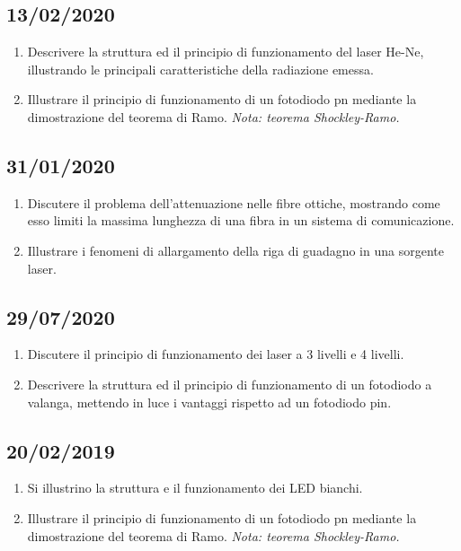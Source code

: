 \documentclass{article}
\begin{document}
\subsection{13/02/2020}
\begin{enumerate}
  \item Descrivere la struttura ed il principio di funzionamento del laser He-Ne, illustrando le principali caratteristiche della radiazione emessa.
  \item Illustrare il principio di funzionamento di un fotodiodo pn mediante la dimostrazione del teorema di Ramo. \textit{Nota: teorema Shockley-Ramo.}
\end{enumerate}

\subsection{31/01/2020}
\begin{enumerate}
  \item Discutere il problema dell’attenuazione nelle fibre ottiche, mostrando come esso limiti la massima lunghezza di
        una fibra in un sistema di comunicazione.
  \item Illustrare i fenomeni di allargamento della riga di guadagno in una sorgente laser.
\end{enumerate}

\subsection{29/07/2020}
\begin{enumerate}
  \item Discutere il principio di funzionamento dei laser a 3 livelli e 4 livelli.
  \item Descrivere la struttura ed il principio di funzionamento di un fotodiodo a valanga, mettendo in luce i vantaggi
        rispetto ad un fotodiodo pin.
\end{enumerate}

\subsection{20/02/2019}
\begin{enumerate}
  \item Si illustrino la struttura e il funzionamento dei LED bianchi.
  \item Illustrare il principio di funzionamento di un fotodiodo pn mediante la dimostrazione del teorema di Ramo. \textit{Nota: teorema Shockley-Ramo.}
\end{enumerate}
\end{document}
